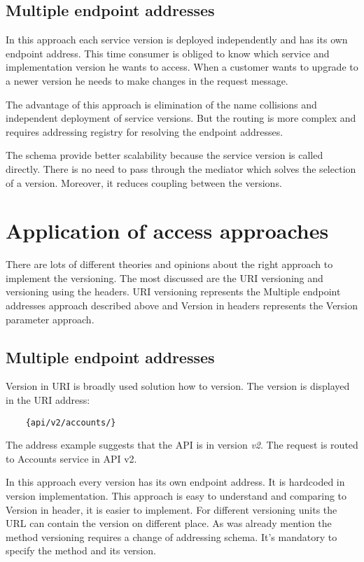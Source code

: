 \subsection{Multiple endpoint addresses}
In this approach each service version is deployed independently and has its own endpoint address. This time consumer is obliged to know which service and implementation version he wants to access. When a customer wants to upgrade to a newer version he needs to make changes in the request message. 

The advantage of this approach is elimination of the name collisions and independent deployment of service versions. But the routing is more complex and requires addressing registry for resolving the endpoint addresses.

The schema provide better scalability because the service version is called directly. There is no need to pass through the mediator which solves the selection of a version. Moreover, it reduces coupling between the versions.


\section{Application of access approaches}
There are lots of different theories and opinions about the right approach to implement the versioning. The most discussed are the URI versioning and versioning using the headers. URI versioning represents the Multiple endpoint addresses approach described above and Version in headers represents the Version parameter approach.


\subsection{Multiple endpoint addresses}
Version in URI is broadly used solution how to version. The version is displayed in the URI address:

\begin{lstlisting}
    {api/v2/accounts/}
\end{lstlisting}

The address example suggests that the API is in version \emph{v2}. The request is routed to Accounts service in API v2.

\bigskip

In this approach every version has its own endpoint address. It is hardcoded in version implementation. This approach is easy to understand and comparing to Version in header, it is easier to implement. For different versioning units the URL can contain the version on different place. As was already mention the method versioning requires a change of addressing schema. It's mandatory to specify the method and its version. 

